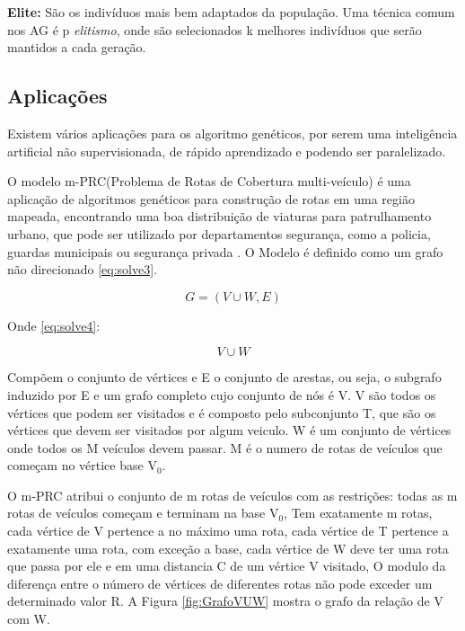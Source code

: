 \textbf{Elite:} São os indivíduos mais bem adaptados da população. Uma técnica comum nos AG é p \textit{elitismo}, onde são selecionados k melhores indivíduos que serão mantidos a cada geração.

\subsection{Aplicações}
Existem vários aplicações para os algoritmo genéticos, por serem uma inteligência artificial não supervisionada, de rápido aprendizado e podendo ser paralelizado.

O modelo m-PRC(Problema de Rotas de Cobertura multi-veículo) é uma aplicação de algoritmos genéticos para construção de rotas em uma região mapeada, encontrando uma boa distribuição de viaturas para patrulhamento urbano, que pode ser utilizado por departamentos segurança, como a policia, guardas municipais ou segurança privada \cite{Washington}. 
O Modelo é definido como um grafo não direcionado \ref{eq:solve3}. 

\begin{equation} \label{eq:solve3}
G=(V\cup W, E)
\end{equation}

Onde \ref{eq:solve4}: 

\begin{equation} \label{eq:solve4}
V\cup W
\end{equation}

Compõem o conjunto de vértices e E o conjunto de arestas, ou seja, o subgrafo induzido por E e um grafo completo cujo conjunto de nós é V. 
V são todos os vértices que podem ser visitados e é composto pelo subconjunto T, que são os vértices que devem ser visitados por algum veiculo. W é um conjunto de vértices onde todos os M veículos devem passar. M é o numero de rotas de veículos que começam no vértice base V$_0$. 

O m-PRC atribui o conjunto de m rotas de veículos com as restrições: todas as m rotas de veículos começam e terminam na base V$_0$, Tem exatamente m rotas, cada vértice de V pertence a no máximo uma rota, cada vértice de T pertence a exatamente uma rota, com exceção a base, cada vértice de W deve ter uma rota que passa por ele e em uma distancia C de um vértice V visitado, O modulo da diferença entre o número de vértices de diferentes rotas não pode exceder um determinado valor R. A Figura \ref{fig:GrafoVUW} mostra o grafo da relação de V com W.

